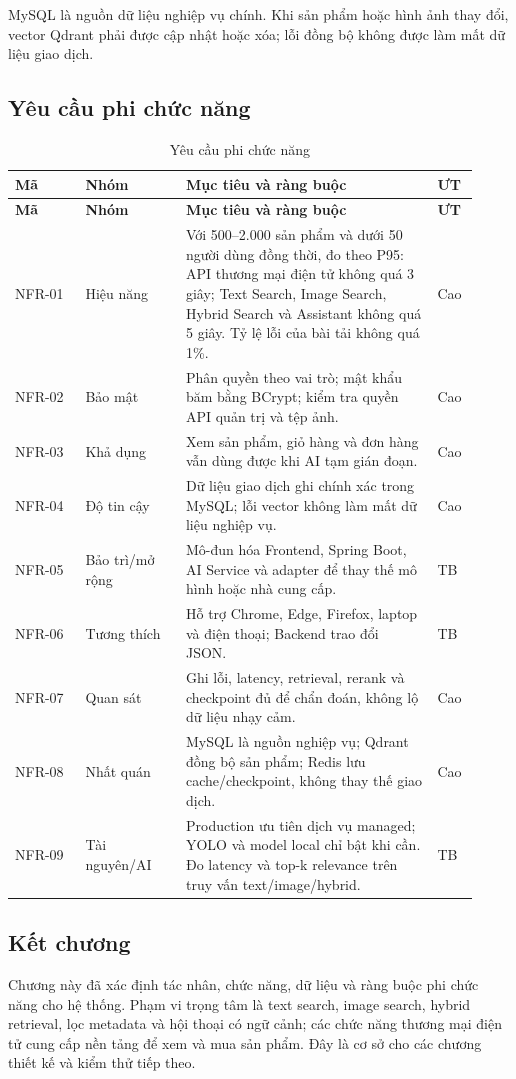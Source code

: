 MySQL là nguồn dữ liệu nghiệp vụ chính. Khi sản phẩm hoặc hình ảnh thay đổi, vector Qdrant phải được cập nhật hoặc xóa; lỗi đồng bộ không được làm mất dữ liệu giao dịch.

\subsection{Yêu cầu phi chức năng}

\begin{longtable}{|p{0.14\linewidth}|p{0.20\linewidth}|p{0.50\linewidth}|p{0.08\linewidth}|}
\caption{Yêu cầu phi chức năng}\label{tab:non-functional-requirements}\\
\hline
\textbf{Mã} & \textbf{Nhóm} & \textbf{Mục tiêu và ràng buộc} & \textbf{ƯT} \\
\hline
\endfirsthead
\hline
\textbf{Mã} & \textbf{Nhóm} & \textbf{Mục tiêu và ràng buộc} & \textbf{ƯT} \\
\hline
\endhead
NFR-01 & Hiệu năng & Với 500--2.000 sản phẩm và dưới 50 người dùng đồng thời, đo theo P95: API thương mại điện tử không quá 3 giây; Text Search, Image Search, Hybrid Search và Assistant không quá 5 giây. Tỷ lệ lỗi của bài tải không quá 1\%. & Cao \\
\hline
NFR-02 & Bảo mật & Phân quyền theo vai trò; mật khẩu băm bằng BCrypt; kiểm tra quyền API quản trị và tệp ảnh. & Cao \\
\hline
NFR-03 & Khả dụng & Xem sản phẩm, giỏ hàng và đơn hàng vẫn dùng được khi AI tạm gián đoạn. & Cao \\
\hline
NFR-04 & Độ tin cậy & Dữ liệu giao dịch ghi chính xác trong MySQL; lỗi vector không làm mất dữ liệu nghiệp vụ. & Cao \\
\hline
NFR-05 & Bảo trì/mở rộng & Mô-đun hóa Frontend, Spring Boot, AI Service và adapter để thay thế mô hình hoặc nhà cung cấp. & TB \\
\hline
NFR-06 & Tương thích & Hỗ trợ Chrome, Edge, Firefox, laptop và điện thoại; Backend trao đổi JSON. & TB \\
\hline
NFR-07 & Quan sát & Ghi lỗi, latency, retrieval, rerank và checkpoint đủ để chẩn đoán, không lộ dữ liệu nhạy cảm. & Cao \\
\hline
NFR-08 & Nhất quán & MySQL là nguồn nghiệp vụ; Qdrant đồng bộ sản phẩm; Redis lưu cache/checkpoint, không thay thế giao dịch. & Cao \\
\hline
NFR-09 & Tài nguyên/AI & Production ưu tiên dịch vụ managed; YOLO và model local chỉ bật khi cần. Đo latency và top-k relevance trên truy vấn text/image/hybrid. & TB \\
\hline
\end{longtable}

\subsection*{Kết chương}

Chương này đã xác định tác nhân, chức năng, dữ liệu và ràng buộc phi chức năng cho hệ thống. Phạm vi trọng tâm là text search, image search, hybrid retrieval, lọc metadata và hội thoại có ngữ cảnh; các chức năng thương mại điện tử cung cấp nền tảng để xem và mua sản phẩm. Đây là cơ sở cho các chương thiết kế và kiểm thử tiếp theo.
